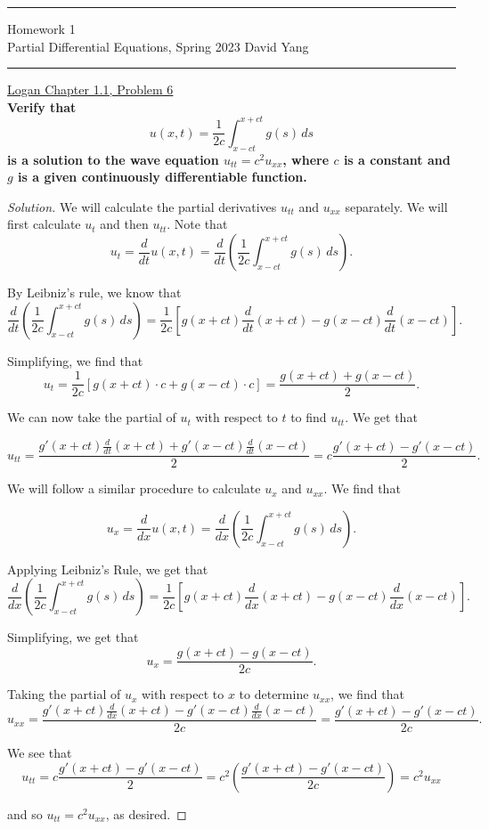 \documentclass[11pt]{article}
\newenvironment{solution}
  {\renewcommand\qedsymbol{$\blacksquare$}\begin{proof}[Solution]}
  {\end{proof}}
\begin{document}
	\hrule
	\begin{center}
		{\Large Homework 1} \\ %
		\vspace{0.2cm}
		Partial Differential Equations, Spring 2023 \hfill David Yang %
	\end{center}

\hrule

\vspace{1em}

\underline{Logan Chapter 1.1, Problem 6} \\

\textbf{Verify that $$u(x, t) = \frac{1}{2c} \int_{x-ct}^{x+ct} g(s) \,ds $$ is a solution to the wave equation $u_{tt} = c^2u_{xx}$, where $c$ is a constant and $g$ is a given continuously differentiable function.} \\

\begin{solution}We will calculate the partial derivatives $u_{tt}$ and $u_{xx}$ separately. We will first calculate $u_t$ and then $u_{tt}.$ Note that $$u_t = \frac{d}{dt} u(x, t) = \frac{d}{dt} \left(\frac{1}{2c} \int_{x-ct}^{x+ct} g(s) \,ds \right).$$

By Leibniz's rule, we know that $$ \frac{d}{dt} \left(\frac{1}{2c} \int_{x-ct}^{x+ct} g(s) \,ds\right) = \frac{1}{2c} \left[g(x+ct) \frac{d}{dt} (x+ct) - g(x-ct)\frac{d}{dt}(x-ct) \right].$$

Simplifying, we find that $$u_t = \frac{1}{2c} \left[g(x+ct) \cdot c + g(x-ct) \cdot c\right] = \frac{g(x+ct) + g(x-ct)}{2}.$$

We can now take the partial of $u_t$ with respect to $t$ to find $u_{tt}$. We get that

$$ u_{tt} = \frac{g'(x+ct)\frac{d}{dt}(x+ct) + g'(x-ct)\frac{d}{dt}(x-ct)}{2} = c \frac{g'(x+ct) - g'(x-ct)}{2}.$$

\vspace{1cm}

We will follow a similar procedure to calculate $u_x$ and $u_{xx}.$ We find that

$$u_x = \frac{d}{dx} u(x, t) = \frac{d}{dx} \left(\frac{1}{2c} \int_{x-ct}^{x+ct} g(s) \,ds \right).$$

Applying Leibniz's Rule, we get that $$ \frac{d}{dx} \left(\frac{1}{2c} \int_{x-ct}^{x+ct} g(s) \,ds \right) = \frac{1}{2c} \left[g(x+ct) \frac{d}{dx} (x+ct) - g(x-ct)\frac{d}{dx}(x-ct) \right].$$

Simplifying, we get that $$u_x =  \frac{g(x+ct) - g(x-ct)}{2c}.$$

Taking the partial of $u_x$ with respect to $x$ to determine $u_{xx}$, we find that $$ u_{xx} = \frac{g'(x+ct)\frac{d}{dx} (x+ct) - g'(x-ct)\frac{d}{dx} (x-ct)}{2c} = \frac{g'(x+ct) - g'(x-ct)}{2c}.$$

We see that $$u_{tt} = c\frac{g'(x+ct)-g'(x-ct)}{2} = c^2 \left(\frac{g'(x+ct) - g'(x-ct)}{2c} \right) = c^2 u_{xx}$$

and so $u_{tt} = c^2u_{xx}$, as desired. \end{solution}
\end{document}
